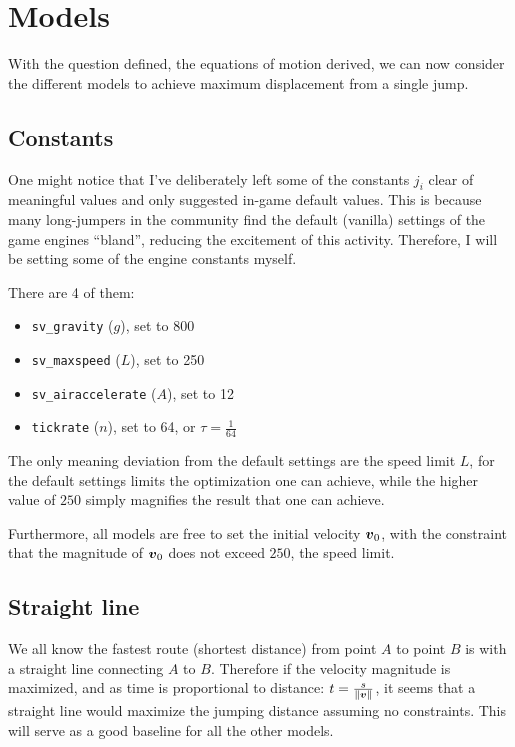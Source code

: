 \section{Models}
With the question defined, the equations of motion derived, we can now consider the different models to achieve maximum displacement from a single jump.

\subsection{Constants}
One might notice that I've deliberately left some of the constants $j_i$ clear of meaningful values and only suggested in-game default values. This is because many long-jumpers in the community find the default (vanilla) settings of the game engines ``bland'', reducing the excitement of this activity. Therefore, I will be setting some of the engine constants myself.

There are 4 of them:
\begin{itemize}
    \item \verb|sv_gravity| ($g$), set to 800
    \item \verb|sv_maxspeed| ($L$), set to 250
    \item \verb|sv_airaccelerate| ($A$), set to 12
    \item \verb|tickrate| ($n$), set to 64, or $\tau=\frac{1}{64}$
\end{itemize}

The only meaning deviation from the default settings are the speed limit $L$, for the default settings limits the optimization one can achieve, while the higher value of $250$ simply magnifies the result that one can achieve.

Furthermore, all models are free to set the initial velocity $\boldsymbol{v}_0$, with the constraint that the magnitude of $\boldsymbol{v}_0$ does not exceed $250$, the speed limit.

\subsection{Straight line}
We all know the fastest route (shortest distance) from point $A$ to point $B$ is with a straight line connecting $A$ to $B$. Therefore if the velocity magnitude is maximized, and as time is proportional to distance: $t = \frac{s}{\|\boldsymbol{v}\|}$, it seems that a straight line would maximize the jumping distance assuming no constraints. This will serve as a good baseline for all the other models.

